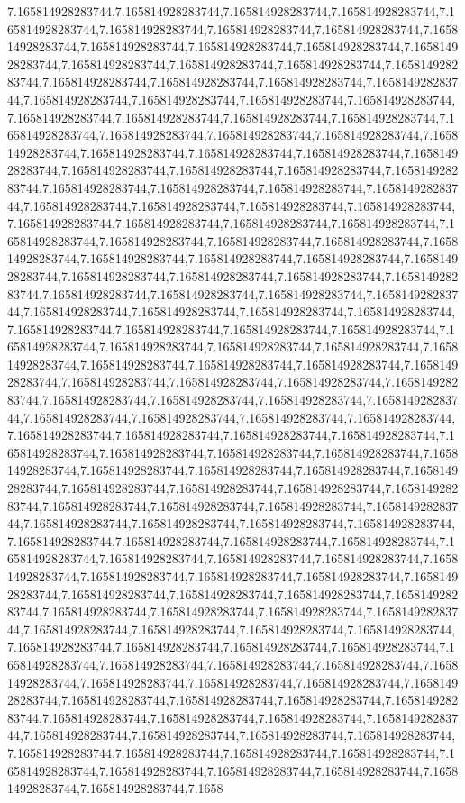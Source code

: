 7.165814928283744,7.165814928283744,7.165814928283744,7.165814928283744,7.165814928283744,7.165814928283744,7.165814928283744,7.165814928283744,7.165814928283744,7.165814928283744,7.165814928283744,7.165814928283744,7.165814928283744,7.165814928283744,7.165814928283744,7.165814928283744,7.165814928283744,7.165814928283744,7.165814928283744,7.165814928283744,7.165814928283744,7.165814928283744,7.165814928283744,7.165814928283744,7.165814928283744,7.165814928283744,7.165814928283744,7.165814928283744,7.165814928283744,7.165814928283744,7.165814928283744,7.165814928283744,7.165814928283744,7.165814928283744,7.165814928283744,7.165814928283744,7.165814928283744,7.165814928283744,7.165814928283744,7.165814928283744,7.165814928283744,7.165814928283744,7.165814928283744,7.165814928283744,7.165814928283744,7.165814928283744,7.165814928283744,7.165814928283744,7.165814928283744,7.165814928283744,7.165814928283744,7.165814928283744,7.165814928283744,7.165814928283744,7.165814928283744,7.165814928283744,7.165814928283744,7.165814928283744,7.165814928283744,7.165814928283744,7.165814928283744,7.165814928283744,7.165814928283744,7.165814928283744,7.165814928283744,7.165814928283744,7.165814928283744,7.165814928283744,7.165814928283744,7.165814928283744,7.165814928283744,7.165814928283744,7.165814928283744,7.165814928283744,7.165814928283744,7.165814928283744,7.165814928283744,7.165814928283744,7.165814928283744,7.165814928283744,7.165814928283744,7.165814928283744,7.165814928283744,7.165814928283744,7.165814928283744,7.165814928283744,7.165814928283744,7.165814928283744,7.165814928283744,7.165814928283744,7.165814928283744,7.165814928283744,7.165814928283744,7.165814928283744,7.165814928283744,7.165814928283744,7.165814928283744,7.165814928283744,7.165814928283744,7.165814928283744,7.165814928283744,7.165814928283744,7.165814928283744,7.165814928283744,7.165814928283744,7.165814928283744,7.165814928283744,7.165814928283744,7.165814928283744,7.165814928283744,7.165814928283744,7.165814928283744,7.165814928283744,7.165814928283744,7.165814928283744,7.165814928283744,7.165814928283744,7.165814928283744,7.165814928283744,7.165814928283744,7.165814928283744,7.165814928283744,7.165814928283744,7.165814928283744,7.165814928283744,7.165814928283744,7.165814928283744,7.165814928283744,7.165814928283744,7.165814928283744,7.165814928283744,7.165814928283744,7.165814928283744,7.165814928283744,7.165814928283744,7.165814928283744,7.165814928283744,7.165814928283744,7.165814928283744,7.165814928283744,7.165814928283744,7.165814928283744,7.165814928283744,7.165814928283744,7.165814928283744,7.165814928283744,7.165814928283744,7.165814928283744,7.165814928283744,7.165814928283744,7.165814928283744,7.165814928283744,7.165814928283744,7.165814928283744,7.165814928283744,7.165814928283744,7.165814928283744,7.165814928283744,7.165814928283744,7.165814928283744,7.165814928283744,7.165814928283744,7.165814928283744,7.165814928283744,7.165814928283744,7.165814928283744,7.165814928283744,7.165814928283744,7.165814928283744,7.165814928283744,7.165814928283744,7.165814928283744,7.165814928283744,7.165814928283744,7.165814928283744,7.165814928283744,7.165814928283744,7.165814928283744,7.165814928283744,7.165814928283744,7.165814928283744,7.165814928283744,7.165814928283744,7.165814928283744,7.165814928283744,7.1658